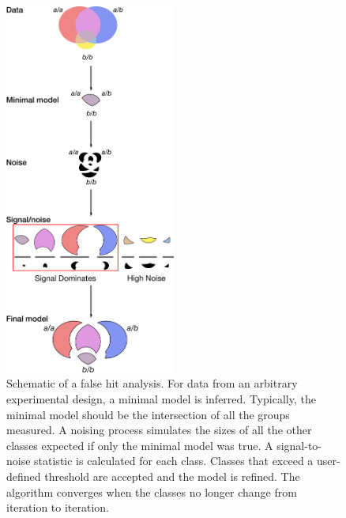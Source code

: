 \documentclass[10pt, twocolumn]{article}
\begin{document}
\begin{figure}
  \centering
  \includegraphics[width=0.5\textwidth]{../figs/false_hit_analysis.pdf}
  \caption{Schematic of a false hit analysis. For data from an
  arbitrary experimental design, a minimal model is inferred. Typically, the
  minimal model should be the intersection of all the groups measured. A noising
  process simulates the sizes of all the other classes expected if only the
  minimal model was true. A signal-to-noise statistic is calculated for each
  class. Classes that exceed a user-defined threshold are accepted and the model
  is refined. The algorithm converges when the classes no longer change from
  iteration to iteration.}
\label{fig:false_hit}
\end{figure}
\end{document}
